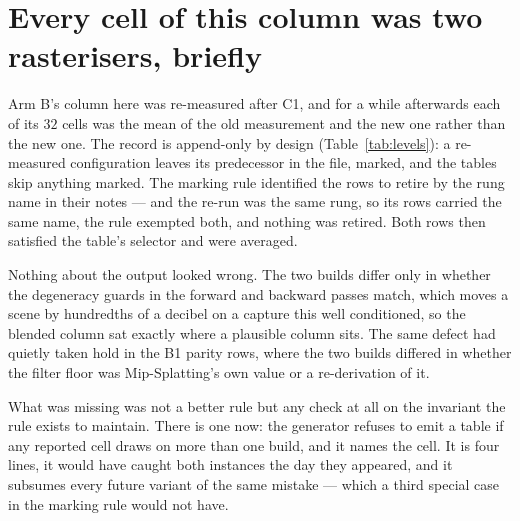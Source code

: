 

\section{Every cell of this column was two rasterisers, briefly}
\label{sec:blend}

Arm B's column here was re-measured after C1, and for a while afterwards each of
its $32$ cells was the mean of the old measurement and the new one rather than
the new one. The record is append-only by design (Table~\ref{tab:levels}): a
re-measured configuration leaves its predecessor in the file, marked, and the
tables skip anything marked. The marking rule identified the rows to retire by
the rung name in their notes --- and the re-run was the same rung, so its rows
carried the same name, the rule exempted both, and nothing was retired. Both
rows then satisfied the table's selector and were averaged.

Nothing about the output looked wrong. The two builds differ only in whether the
degeneracy guards in the forward and backward passes match, which moves a scene
by hundredths of a decibel on a capture this well conditioned, so the blended
column sat exactly where a plausible column sits. The same defect had quietly
taken hold in the B1 parity rows, where the two builds differed in whether the
filter floor was Mip-Splatting's own value or a re-derivation of it.

What was missing was not a better rule but any check at all on the invariant the
rule exists to maintain. There is one now: the generator refuses to emit a table
if any reported cell draws on more than one build, and it names the cell. It is
four lines, it would have caught both instances the day they appeared, and it
subsumes every future variant of the same mistake --- which a third special case
in the marking rule would not have.




